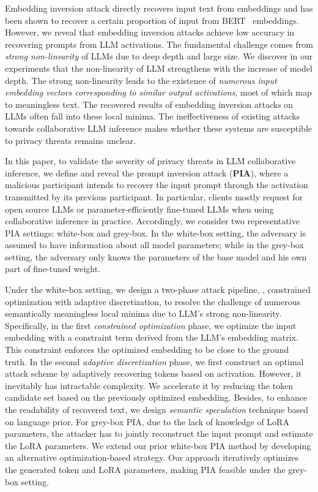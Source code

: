 Embedding inversion attack directly recovers input text from embeddings and has been shown to recover a certain proportion of input from BERT~\cite{devlin2018bert} embeddings. However, we reveal that embedding inversion attacks achieve low accuracy in recovering prompts from LLM activations. The fundamental challenge comes from \emph{strong non-linearity} of LLMs due to deep depth and large size. We discover in our experiments that the non-linearity of LLM strengthens with the increase of model depth. The strong non-linearity leads to the existence of \emph{numerous input embedding vectors corresponding to similar output activations}, most of which map to meaningless text. The recovered results of embedding inversion attacks on LLMs often fall into these local minima.  
The ineffectiveness of existing attacks towards collaborative LLM inference makes whether these systems are susceptible to privacy threats remains unclear. 

In this paper, to validate the severity of privacy threats in LLM collaborative inference, we define and reveal the prompt inversion attack (\textbf{PIA}),  where a malicious participant intends to recover the input prompt through the activation transmitted by its previous participant. 
In particular, clients mostly request for open source LLMs or parameter-efficiently fine-tuned LLMs when using collaborative inference in practice.  
Accordingly, we consider two representative PIA settings: white-box and grey-box. In the white-box setting, the adversary is assumed to have information about all model parameters; while in the grey-box setting, the adversary only knows the parameters of the base model and his own part of fine-tuned weight.

Under the white-box setting, we design a two-phase attack pipeline, \ie, constrained optimization with adaptive discretization, to resolve the challenge of numerous semantically meaningless local minima due to LLM's strong non-linearity.
Specifically, in the first \emph{constrained optimization} phase, we optimize the input embedding with a constraint term derived from the LLM's embedding matrix. 
This constraint enforces the optimized embedding to be close to the ground truth.
In the second \emph{adaptive discretization} phase, we first construct an optimal attack scheme by adaptively recovering tokens based on activation. However, it inevitably has intractable complexity. We accelerate it by reducing the token candidate set based on the previously optimized embedding. Besides, to enhance the readability of recovered text, we design \emph{semantic speculation} technique based on language prior. 
 For grey-box PIA, due to the lack of knowledge of LoRA parameters, the attacker has to jointly reconstruct the input prompt and estimate the LoRA parameters. We extend our prior white-box PIA method by developing an alternative optimization-based strategy. Our approach iteratively optimizes the generated token and LoRA parameters, making PIA feasible under the grey-box setting.




